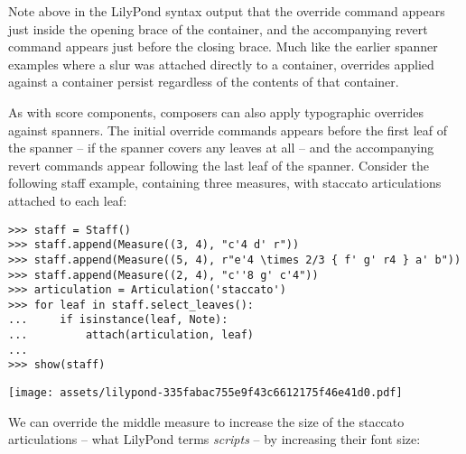\noindent Note above in the LilyPond syntax output that the override command
appears just inside the opening brace of the container, and the accompanying
revert command appears just before the closing brace. Much like the earlier
spanner examples where a slur was attached directly to a container, overrides
applied against a container persist regardless of the contents of that
container.

As with score components, composers can also apply typographic overrides
against spanners. The initial override commands appears before the first leaf
of the spanner -- if the spanner covers any leaves at all -- and the
accompanying revert commands appear following the last leaf of the spanner.
Consider the following staff example, containing three measures, with staccato
articulations attached to each leaf:

\begin{comment}
<abjad>
staff = Staff()
staff.append(Measure((3, 4), "c'4 d' r"))
staff.append(Measure((5, 4), r"e'4 \times 2/3 { f' g' r4 } a' b"))
staff.append(Measure((2, 4), "c''8 g' c'4"))
articulation = Articulation('staccato')
for leaf in staff.select_leaves():
    if isinstance(leaf, Note):
        attach(articulation, leaf)

show(staff)
</abjad>
\end{comment}

\begin{abjadbookoutput}
\begin{singlespacing}
\vspace{-0.5\baselineskip}
\begin{verbatim}
>>> staff = Staff()
>>> staff.append(Measure((3, 4), "c'4 d' r"))
>>> staff.append(Measure((5, 4), r"e'4 \times 2/3 { f' g' r4 } a' b"))
>>> staff.append(Measure((2, 4), "c''8 g' c'4"))
>>> articulation = Articulation('staccato')
>>> for leaf in staff.select_leaves():
...     if isinstance(leaf, Note):
...         attach(articulation, leaf)
...
>>> show(staff)
\end{verbatim}
\noindent\texttt{[image: assets/lilypond-335fabac755e9f43c6612175f46e41d0.pdf]}
\end{singlespacing}
\end{abjadbookoutput}

\noindent We can override the middle measure to increase the size of the
staccato articulations -- what LilyPond terms \emph{scripts} -- by increasing
their font size:

\begin{comment}
<abjad>
override(staff[1]).script.font_size = 10
show(staff)
</abjad>
\end{comment}

